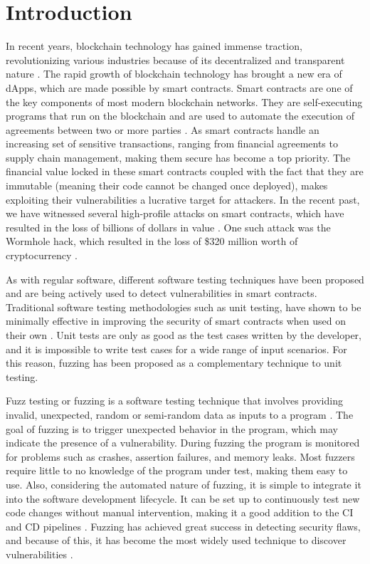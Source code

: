 
\chapter{Introduction}\label{chapter:introduction}
In recent years, blockchain technology has gained immense traction, revolutionizing various industries because of its decentralized and transparent nature \cite{noauthor_global_nodate}.
The rapid growth of blockchain technology has brought a new era of \acp{dApp}, which are made possible by smart contracts.
Smart contracts are one of the key components of most modern blockchain networks.
They are self-executing programs that run on the blockchain and are used to automate the execution of agreements between two or more parties \cite{zou_smart_2021}.
As smart contracts handle an increasing set of sensitive transactions, ranging from financial agreements to supply chain management, making them secure has become a top priority.
The financial value locked in these smart contracts coupled with the fact that they are immutable (meaning their code cannot be changed once deployed), makes exploiting their vulnerabilities a lucrative target for attackers.
In the recent past, we have witnessed several high-profile attacks on smart contracts, which have resulted in the loss of billions of dollars in value  \cite{noauthor_funds_nodate}.
One such attack was the Wormhole hack, which resulted in the loss of \$320 million worth of cryptocurrency \cite{faife_wormhole_2022}.

As with regular software, different software testing techniques have been proposed and are being actively used to detect vulnerabilities in smart contracts.
Traditional software testing methodologies such as unit testing, have shown to be minimally effective in improving the security of smart contracts when used on their own \cite{noauthor_smart_nodate}.
Unit tests are only as good as the test cases written by the developer, and it is impossible to write test cases for a wide range of input scenarios.
For this reason, fuzzing has been proposed as a complementary technique to unit testing.

Fuzz testing or fuzzing is a software testing technique that involves providing invalid, unexpected, random or semi-random data as inputs to a program \cite{manes_art_2019}.
The goal of fuzzing is to trigger unexpected behavior in the program, which may indicate the presence of a vulnerability.
During fuzzing the program is monitored for problems such as crashes, assertion failures, and memory leaks.
Most fuzzers require little to no knowledge of the program under test, making them easy to use.
Also, considering the automated nature of fuzzing, it is simple to integrate it into the software development lifecycle.
It can be set up to continuously test new code changes without manual intervention, making it a good addition to the \ac{CI} and \ac{CD} pipelines \cite{klooster_effectiveness_2022}.
Fuzzing has achieved great success in detecting security flaws, and because of this, it has become the most widely used technique to discover vulnerabilities \cite{li_fuzzing_2018, zhu_fuzzing_2022}.

